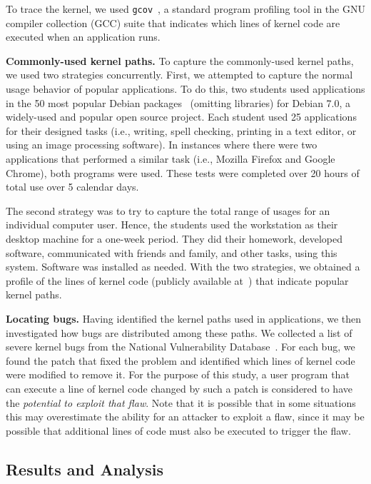 To trace the kernel, we used \texttt{gcov}~\cite{gcov}, a standard program profiling
tool in the GNU compiler collection (GCC) suite that indicates which lines of kernel
code are executed when an application runs.

\textbf{Commonly-used kernel paths.}
To capture the commonly-used kernel paths, we used two strategies concurrently.
First, we attempted to capture the normal usage behavior of popular applications.
To do this, two students used applications in the 50 most popular Debian
packages~\cite{Top-Packages} (omitting libraries) for Debian 7.0, a widely-used and
popular open source project.
Each student used 25 applications for their designed
tasks (i.e., writing, spell checking, printing in a text editor, or using
an image processing software). In instances where there were two applications that performed a
similar task (i.e., Mozilla Firefox and Google Chrome), both programs were
used. These tests were completed over 20 hours of
total use over 5 calendar days.

The second strategy was to try to capture the total range of usages for an
individual computer user. Hence, the students used the workstation as their
desktop machine for a one-week period. They did their homework, developed
software, communicated with friends and family, and other tasks, using this system.
Software was installed as needed.
%
With the two strategies, we obtained a profile of the lines of
kernel code (publicly available at~\cite{Lind}) that indicate
popular kernel paths.

\textbf{Locating bugs.}
Having identified the kernel paths used in applications,
we then investigated how bugs are distributed among these paths. We collected a list of
severe kernel bugs from the National Vulnerability Database~\cite{NVD}.
For each bug, we found the patch that fixed the problem and identified
which lines of kernel code were modified to remove it.
For the purpose of this study, a user program that can execute a line of kernel
code changed by such a patch is considered to have the \textit{potential to
exploit that flaw}.  Note that it is possible that in some situations this may
overestimate the ability for an attacker to exploit a flaw, since it may be
possible that additional lines of code must also be executed to trigger the flaw.


\subsection{Results and Analysis}
\label{Verification-of-Hypothesis}


